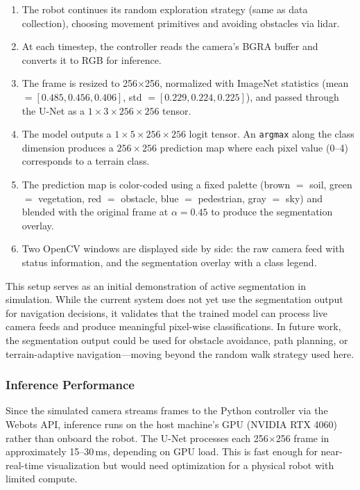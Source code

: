 \documentclass[12pt,a4paper]{article}
\begin{document}
\begin{enumerate}[noitemsep]
    \item The robot continues its random exploration strategy (same as data collection), choosing movement primitives and avoiding obstacles via lidar.
    \item At each timestep, the controller reads the camera's BGRA buffer and converts it to RGB for inference.
    \item The frame is resized to 256$\times$256, normalized with ImageNet statistics (mean $= [0.485, 0.456, 0.406]$, std $= [0.229, 0.224, 0.225]$), and passed through the U-Net as a $1 \times 3 \times 256 \times 256$ tensor.
    \item The model outputs a $1 \times 5 \times 256 \times 256$ logit tensor. An \texttt{argmax} along the class dimension produces a $256 \times 256$ prediction map where each pixel value (0--4) corresponds to a terrain class.
    \item The prediction map is color-coded using a fixed palette (brown $=$ soil, green $=$ vegetation, red $=$ obstacle, blue $=$ pedestrian, gray $=$ sky) and blended with the original frame at $\alpha = 0.45$ to produce the segmentation overlay.
    \item Two OpenCV windows are displayed side by side: the raw camera feed with status information, and the segmentation overlay with a class legend.
\end{enumerate}

This setup serves as an initial demonstration of active segmentation in simulation. While the current system does not yet use the segmentation output for navigation decisions, it validates that the trained model can process live camera feeds and produce meaningful pixel-wise classifications. In future work, the segmentation output could be used for obstacle avoidance, path planning, or terrain-adaptive navigation---moving beyond the random walk strategy used here.

\subsubsection{Inference Performance}

Since the simulated camera streams frames to the Python controller via the Webots API, inference runs on the host machine's GPU (NVIDIA RTX 4060) rather than onboard the robot. The U-Net processes each 256$\times$256 frame in approximately 15--30\,ms, depending on GPU load. This is fast enough for near-real-time visualization but would need optimization for a physical robot with limited compute.
\end{document}
